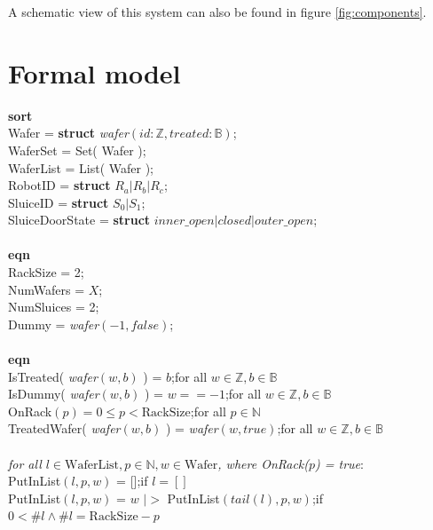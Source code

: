 \documentclass[12pt]{report}
\begin{document}
	A schematic view of this system can also be found in figure \ref{fig:components}.
	
	\section{Formal model}
	\textbf{sort}\\
	\phantom{----} Wafer = \textbf{struct} \emph{wafer}$( id:\mathbb{Z}, treated:\mathbb{B} )$;\\
	\phantom{----} WaferSet = Set( Wafer );\\
	\phantom{----} WaferList = List( Wafer );\\
	\phantom{----} RobotID = \textbf{struct} $R_a | R_b | R_c$;\\
	\phantom{----} SluiceID = \textbf{struct} $S_0 | S_1$;\\
	\phantom{----} SluiceDoorState = \textbf{struct} $inner\_open|closed|outer\_open$;\\
	\\
	\textbf{eqn}\\
	\phantom{----} RackSize = 2;\\
	\phantom{----} NumWafers = $X$;\\
	\phantom{----} NumSluices = 2;\\
	\phantom{----} Dummy = \emph{wafer}$( -1, false)$;\\
	\\
	\textbf{eqn}\\
	\phantom{----} IsTreated( \emph{wafer}$( w, b )$ ) = $b$;\hfill for all $w \in \mathbb{Z}, b \in \mathbb{B}$\\
	\phantom{----} IsDummy(  \emph{wafer}$( w, b )$ ) = $w == -1$;\hfill for all $w \in \mathbb{Z}, b \in \mathbb{B}$\\
	\phantom{----} OnRack$( p ) = 0 \leq p < \text{RackSize}$;\hfill for all $p \in \mathbb{N}$\\
	\phantom{----} TreatedWafer(  \emph{wafer}$( w, b )$ ) =  \emph{wafer}$( w, true )$;\hfill for all $w \in \mathbb{Z}, b \in \mathbb{B}$\\
	\\
	\phantom{----} \emph{for all $l \in \text{WaferList}, p \in \mathbb{N}, w \in \text{Wafer}$, where OnRack($p$) = true}:\\
	\phantom{----} PutInList$( l, p, w )$ = [];\hfill if $l=[]$\\
	\phantom{----} PutInList$( l, p, w )$ = $w$ $|>$ PutInList$( tail( l ), p, w )$;\hfill if $0 < \#l \land \#l = \text{RackSize} - p$\\
\end{document}
